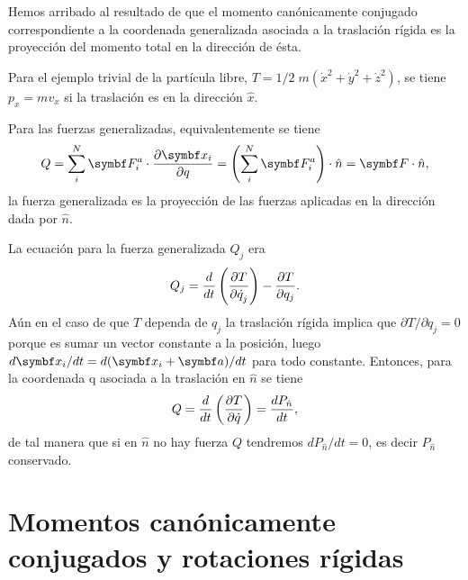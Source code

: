 \documentclass[10pt,oneside]{CBFT_book}
\begin{document}
Hemos arribado al resultado de que el momento canónicamente conjugado correspondiente a la coordenada
generalizada asociada a la traslación rígida es la proyección del momento total en la dirección de ésta.

Para el ejemplo trivial de la partícula libre, $T = 1/2 \; m (\dot{x}^2+ \dot{y}^2+\dot{z}^2)$, se
tiene $ p_x = m v_x $ si la traslación es en la dirección $ \hat{x} $.

Para las fuerzas generalizadas, equivalentemente se tiene 
\[
	Q = \sum_i^N \vb{F}^a_i \cdot \dpar{\vb{x}_i}{q} =
	\left( \sum_i^N \vb{F}^a_i \right) \cdot \hat{n} = \vb{F}\cdot \hat{n},
\]
la fuerza generalizada es la proyección de las fuerzas aplicadas en la dirección dada por $ \hat{n} $.

La ecuación para la fuerza generalizada $Q_j$ era
\[
	Q_j = \frac{d}{dt}\left( \frac{\partial^{\hspace{-0.05em}} {T}}{\partial {\dot{q}_j}^{\hspace{-0.05em}}} \right) - \frac{\partial^{\hspace{-0.05em}} {T}}{\partial {q_j}^{\hspace{-0.05em}}}.
\]
Aún en el caso de que $T$ dependa de $q_j$ la traslación rígida implica que 
$ \partial{T}/\partial{q_j} = 0 $ 
porque es sumar un vector constante a la posición, luego $ d\vb{x}_i/dt = d(\vb{x}_i + \vb{a}) /dt$
para todo  constante. Entonces, para la coordenada q asociada a la traslación en $\hat{n}$
se tiene 
\[
	Q = \frac{d}{dt}\left( \frac{\partial^{\hspace{-0.05em}} {T}}{\partial {\dot{q}}^{\hspace{-0.05em}}} \right) = \frac{d^{\hspace{-0.05em}} {P_{\hat{n}}}}{d {t}^{\hspace{-0.05em}}},
\]
de tal manera que si en $\hat{n}$ no hay fuerza $Q$ tendremos $ d P_{\hat{n}}/dt = 0 $, es decir 
$ P_{\hat{n}} $ conservado.



\section{Momentos canónicamente conjugados y rotaciones rígidas}
\end{document}
